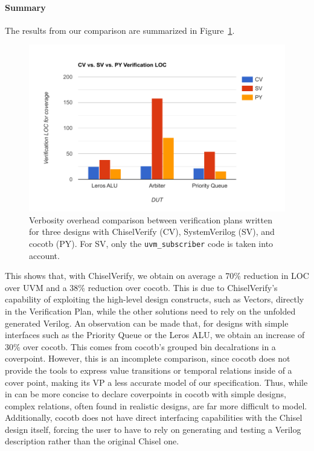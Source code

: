 \documentclass[conference]{IEEEtran}
\begin{document}
\paragraph{Summary} The results from our comparison are summarized in Figure~\ref{fig:cvsvpycomp}.
\begin{figure}[h]
  \centering
  \includegraphics[trim=0.7cm 0.5cm 1cm 1cm, clip, width=.9\linewidth]{svcvpycomp.pdf}
  \caption{Verbosity overhead comparison between verification plans written for three designs with ChiselVerify (CV), SystemVerilog (SV), and cocotb (PY). For SV, only the \texttt{uvm\_subscriber} code is taken into account. }
  \label{fig:cvsvpycomp}
  \end{figure}
  This shows that, with ChiselVerify, we obtain on average a 70\% reduction in LOC over UVM and a 38\% reduction over cocotb. 
  This is due to ChiselVerify's capability of exploiting the high-level design constructs, such as Vectors, directly in the Verification Plan, while the other solutions need to rely on the unfolded generated Verilog.
  An observation can be made that, for designs with simple interfaces such as the Priority Queue or the Leros ALU, we obtain an increase of 30\% over cocotb. 
  This comes from cocotb's grouped bin decalrations in a coverpoint.
  However, this is an incomplete comparison, since cocotb does not provide the tools to express value transitions or temporal relations inside of a cover point, making its VP a less accurate model of our specification.
  Thus, while in can be more concise to declare coverpoints in cocotb with simple designs, complex relations, often found in realistic designs, are far more difficult to model.
  Additionally, cocotb does not have direct interfacing capabilities with the Chisel design itself, forcing the user to have to rely on generating and testing a Verilog description rather than the original Chisel one.
\end{document}

